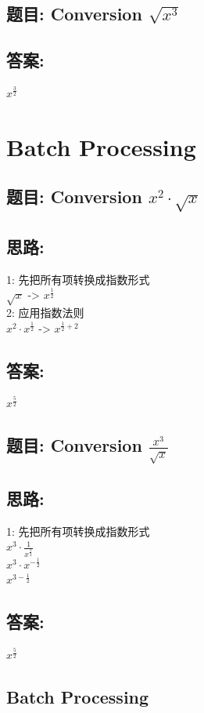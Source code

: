 \documentclass[12pt]{article}
\begin{document}
\subsection*{题目: Conversion  $\sqrt{x^{3}}$}
\subsection*{答案:}
$x^{\frac{3}{2}}$


\section{Batch Processing}
\subsection*{题目: Conversion  $x^{2}\cdot\sqrt{x}$}
\subsection*{思路:}
1: 先把所有项转换成指数形式 \\
$\sqrt{x}$ ->  $x^{\frac{1}{2}}$  \\
2: 应用指数法则 \\ 
$x^{2} \cdot x^{\frac{1}{2}}$  ->  $x ^ {\frac{1}{2} + 2}$ \\

\subsection*{答案:}
$x^{\frac{5}{2}}$
\subsection*{题目: Conversion  $\frac{x^{3}}{\sqrt{x}}$}
\subsection*{思路:}
1: 先把所有项转换成指数形式 \\
$x^{3}\cdot\frac{1}{x^{\frac{1}{2}}}$ \\
$x^{3}\cdot x^{-\frac{1}{2}}$ \\
$x^{3 - \frac{1}{2}}$ \\
\subsection*{答案:}
$x^{\frac{5}{2}}$ \\


\subsection*{Batch Processing}
\end{document}
